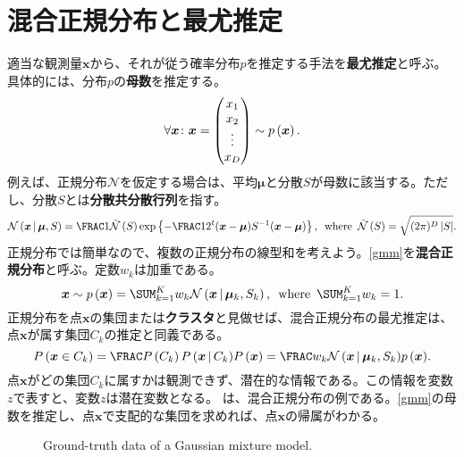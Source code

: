 \documentclass[10pt,a4paper]{book}
\begin{document}
\chapter{混合正規分布と最尤推定\label{chap:gmm}}

適当な観測量$\bm{x}$から、それが従う確率分布$p$を推定する手法を\textbf{最尤推定}と呼ぶ。具体的には、分布$p$の\textbf{母数}を推定する。
%
\begin{equation}
\forall\bm{x}\colon \bm{x} =
\begin{pmatrix}
x_1\\
x_2\\
\vdots\\
x_D
\end{pmatrix}
\sim \prob{\bm{x}}.
\end{equation}
%
例えば、正規分布$\mathcal{N}$を仮定する場合は、平均$\bm{\mu}$と分散$S$が母数に該当する。ただし、分散$S$とは\textbf{分散共分散行列}を指す。
%
\begin{equation}
\label{eq:gmm:n}
\Nd{\bm{x}}{\bm{\mu},S} =
\frac{1}{\Nn{S}} \exp \seq{-\frac{1}{2} \trans{(\bm{x}-\bm{\mu})} S^{-1} (\bm{x}-\bm{\mu})},
\where
\Nn{S} = \sqrt{(2\pi)^D\abs{S}}.
\end{equation}
%
正規分布では簡単なので、複数の正規分布の線型和を考えよう。\eqref{gmm}を\textbf{混合正規分布}と呼ぶ。定数$w_k$は加重である。
%
\begin{equation}
\label{eq:gmm}
\bm{x} \sim \prob{\bm{x}} = \sum_{k=1}^K w_k \Nd{\bm{x}}{\bm{\mu}_k,S_k},
\where
\sum_{k=1}^K w_k = 1.
\end{equation}
%
正規分布を点$\bm{x}$の集団または\textbf{クラスタ}と見做せば、混合正規分布の最尤推定は、点$\bm{x}$が属す集団$C_k$の推定と同義である。
%
\begin{equation}
\Prob{\bm{x} \in C_k} =
\frac{\Prob{C_k}\Prob{\bm{x}}[C_k]}{\Prob{\bm{x}}} =
\frac{w_k \Nd{\bm{x}}{\bm{\mu}_k,S_k}}{\prob{\bm{x}}}.
\end{equation}
%
点$\bm{x}$がどの集団$C_k$に属すかは観測できず、潜在的な情報である。この情報を変数$z$で表すと、変数$z$は潜在変数となる。
は、混合正規分布の例である。\eqref{gmm}の母数を推定し、点$\bm{x}$で支配的な集団を求めれば、点$\bm{x}$の帰属がわかる。

\begin{figure}[h]
\centering
{}
\caption{Ground-truth data of a Gaussian mixture model.\label{fig:gmm}}
\end{figure}
\end{document}

